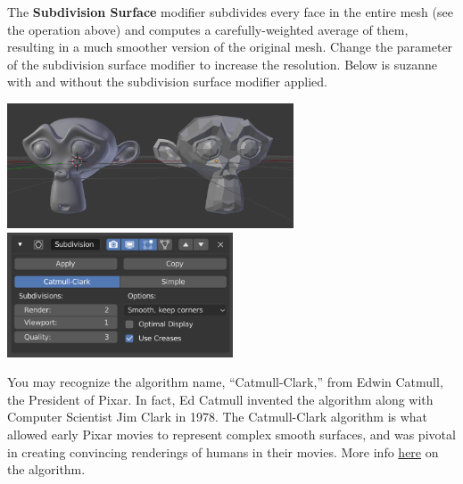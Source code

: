 \documentclass[11pt]{article}
\begin{document}
The \textbf{Subdivision Surface} modifier subdivides every face in the entire mesh (see the
 operation above) and computes a carefully-weighted average of them, resulting in a
much smoother version of the original mesh.  Change the  parameter of the subdivision
surface modifier to increase the resolution.  Below is suzanne with and without the subdivision 
surface modifier applied.
\begin{center}
    \includegraphics[height=10em]{subdiv-1} \includegraphics[height=10em]{subdiv-2}
\end{center}
You may recognize the algorithm name, ``Catmull-Clark,'' from Edwin Catmull, the President of Pixar.
In fact, Ed Catmull invented the algorithm along with Computer Scientist Jim Clark in 1978.  The
Catmull-Clark algorithm is what allowed early Pixar movies to represent complex smooth surfaces, and
was pivotal in creating convincing renderings of humans in their movies.  More info 
\href{https://en.wikipedia.org/wiki/Catmull–Clark_subdivision_surface}{here} on the algorithm.
\end{document}
